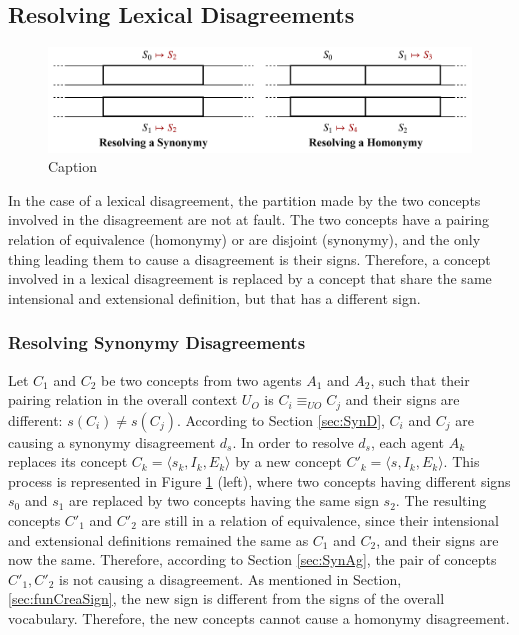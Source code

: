 \subsection{Resolving Lexical Disagreements}

\begin{figure}[t]
    \centering
    \includegraphics[width=\textwidth]{figs/Lexical.pdf}
    \caption{Caption}
    \label{fig:SolveLexical}
\end{figure}

In the case of a lexical disagreement, the partition made by the two concepts involved in the disagreement are not at fault. The two concepts have a pairing relation of equivalence (homonymy) or are disjoint (synonymy), and the only thing leading them to cause a disagreement is their signs. Therefore, a concept involved in a lexical disagreement is replaced by a concept that share the same intensional and extensional definition, but that has a different sign.

\subsubsection{Resolving Synonymy Disagreements}

Let $C_{1}$ and $C_{2}$ be two concepts from two agents $A_{1}$ and $A_{2}$, such that their pairing relation in the overall context $U_{O}$ is $C_{i} \equiv_{UO} C_{j}$ and their signs are different: $s(C_{i}) \neq s(C_{j})$. According to Section \ref{sec:SynD}, $C_{i}$ and $C_{j}$ are causing a synonymy disagreement $d_{s}$.
In order to resolve $d_{s}$, each agent $A_{k}$ replaces its concept $C_{k} = \langle s_{k}, I_{k}, E_{k} \rangle$ by a new concept $C'_{k} = \langle s, I_{k}, E_{k} \rangle$. This process is represented in Figure \ref{fig:SolveLexical} (left), where two concepts having different signs $s_{0}$ and $s_{1}$ are replaced by two concepts having the same sign $s_{2}$.
The resulting concepts $C'_{1}$ and $C'_{2}$ are still in a relation of equivalence, since their intensional and extensional definitions remained the same as $C_{1}$ and $C_{2}$, and their signs are now the same. Therefore, according to Section \ref{sec:SynAg}, the pair of concepts $C'_{1}, C'_{2}$ is not causing a disagreement.
As mentioned in Section, \ref{sec:funCreaSign}, the new sign is different from the signs of the overall vocabulary. Therefore, the new concepts cannot cause a homonymy disagreement.

